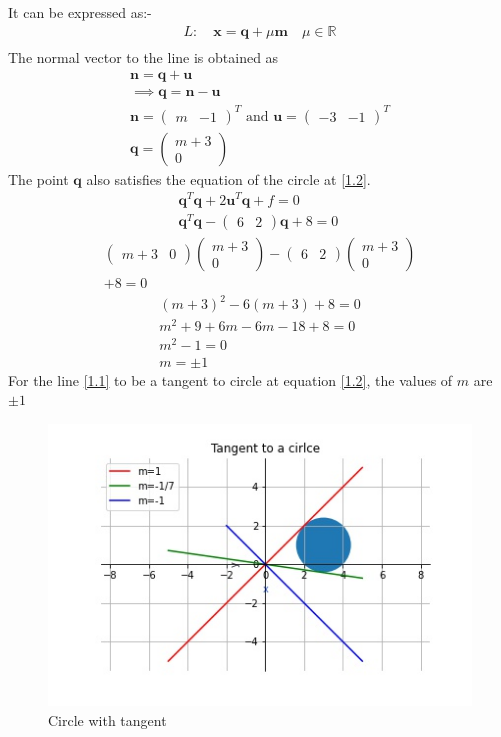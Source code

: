\documentclass[journal,12pt,twocolumn]{IEEEtran}
\let\vec\mathbf
\numberwithin{equation}{subsection}
\newcommand{\myvec}[1]{\ensuremath{\begin{pmatrix}#1\end{pmatrix}}}
\begin{document}
It can be expressed as:-
\begin{align}
L: \quad \vec{x} = \vec{q} + \mu \vec{m} \quad \mu \in \mathbb{R} \label{2.10} \\
\end{align}
The normal vector to the line is obtained as
\begin{align}
\vec{n} = \vec{q} + \vec{u}\\
\implies \vec{q}  = \vec{n} -  \vec{u}\\
\vec{n} =\myvec{m & -1 }^T  \text{ and } \vec{u} =\myvec{-3 & -1}^T\\
\vec{q} = \myvec{m+3 \\ 0}
\end{align}
The point $\vec{q}$ also satisfies the equation of the circle at \ref{1.2}.
\begin{align}
\vec{q}^T\vec{q}+ 2\vec{u}^T\vec{q} + f = 0 \\
\vec{q}^T\vec{q}-\myvec{6 &  2}\vec{q}+8 = 0 \
\end{align}
\begin{multline}
\myvec{m+3 & 0}\myvec{m+3 \\ 0}-\myvec{6 &  2}\myvec{m+3 \\0}\\+8 = 0
\end{multline}
\begin{align}
(m+3)^2 -6(m+3) +8 =0\\
m^2 + 9 + 6m -6m -18 +8 =0\\
m^2 -1 =0\\
m=\pm 1
\end{align}
For the line \ref{1.1} to be a tangent to circle at equation \ref{1.2}, the values of $m$ are $\pm1$
\begin{figure}[!]
\includegraphics[width=1\columnwidth]{tangent.jpg}
\caption{Circle with tangent}
\end{figure}
\end{document}
